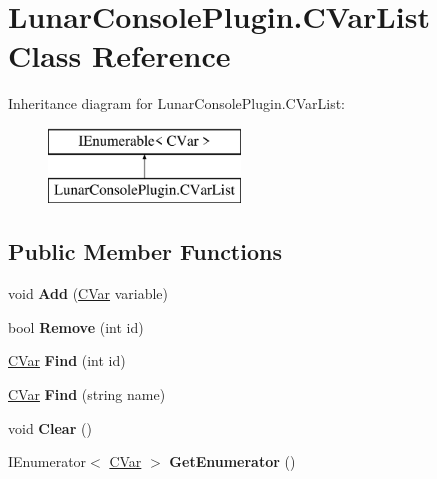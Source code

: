 \hypertarget{class_lunar_console_plugin_1_1_c_var_list}{}\section{Lunar\+Console\+Plugin.\+C\+Var\+List Class Reference}
\label{class_lunar_console_plugin_1_1_c_var_list}
Inheritance diagram for Lunar\+Console\+Plugin.\+C\+Var\+List\+:\begin{figure}[H]
\begin{center}
\leavevmode
\includegraphics[height=2.000000cm]{class_lunar_console_plugin_1_1_c_var_list}
\end{center}
\end{figure}
\subsection*{Public Member Functions}
\begin{DoxyCompactItemize}
\item 
\mbox{\label{class_lunar_console_plugin_1_1_c_var_list_a1dd68b7c7f032e3d0a228c99c14e8c0a}} 
void {\bfseries Add} (\mbox{\hyperlink{class_lunar_console_plugin_1_1_c_var}{C\+Var}} variable)
\item 
\mbox{\label{class_lunar_console_plugin_1_1_c_var_list_a0b410a484f04377b9e9d6ba16cc2b034}} 
bool {\bfseries Remove} (int id)
\item 
\mbox{\label{class_lunar_console_plugin_1_1_c_var_list_a108a69318911270b987a4f8430231f42}} 
\mbox{\hyperlink{class_lunar_console_plugin_1_1_c_var}{C\+Var}} {\bfseries Find} (int id)
\item 
\mbox{\label{class_lunar_console_plugin_1_1_c_var_list_ad08858fae63a0e0809188b34c1ed015e}} 
\mbox{\hyperlink{class_lunar_console_plugin_1_1_c_var}{C\+Var}} {\bfseries Find} (string name)
\item 
\mbox{\label{class_lunar_console_plugin_1_1_c_var_list_ab0528896a21bf6748831cf8ecd2a4887}} 
void {\bfseries Clear} ()
\item 
\mbox{\label{class_lunar_console_plugin_1_1_c_var_list_a46339a903f270dd5f42c376501e25850}} 
I\+Enumerator$<$ \mbox{\hyperlink{class_lunar_console_plugin_1_1_c_var}{C\+Var}} $>$ {\bfseries Get\+Enumerator} ()
\end{DoxyCompactItemize}
